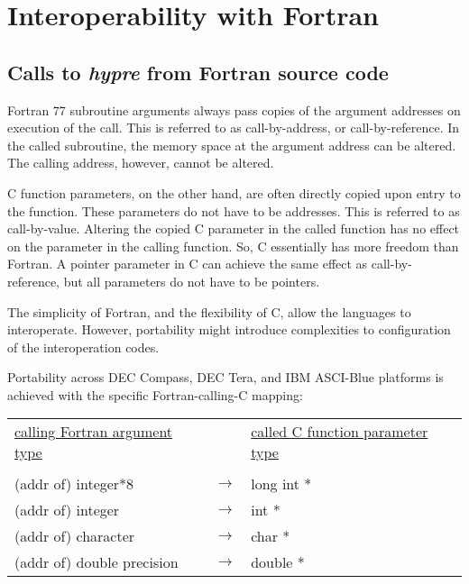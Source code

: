 \chapter{Interoperability with Fortran}

\section{Calls to {\itshape hypre} from Fortran source code}

Fortran 77 subroutine arguments always pass copies of the argument addresses
on execution of the call.  This is referred to as call-by-address, or
call-by-reference.  In the called subroutine, the memory space at the
argument address can be altered.  The calling address, however, cannot be
altered.

C function parameters, on the other hand, are often directly copied upon
entry to the function.  These parameters do not have to be addresses.
This is referred to as call-by-value.  Altering the copied C parameter in the
called function has no effect on the parameter in the calling function.  So,
C essentially has more freedom than Fortran.  A pointer parameter in C can
achieve the same effect as call-by-reference, but all parameters do not have
to be pointers.

The simplicity of Fortran, and the flexibility of C, allow the languages to
interoperate.  However, portability might introduce complexities to
configuration of the interoperation codes.

Portability across DEC Compass, DEC Tera, and IBM ASCI-Blue platforms is
achieved with the specific Fortran-calling-C mapping: 

\vspace{0.2in}

\begin{tabular}{lcl}

\underline{calling Fortran argument type} & &
\underline{called C function parameter type} \\
                              &                   &   \\
\hspace{0.1in} (addr of) integer*8        & $\longrightarrow$ &
\hspace{0.3in} long int * \\
\hspace{0.1in} (addr of) integer          & $\longrightarrow$ &
\hspace{0.3in} int * \\
\hspace{0.1in} (addr of) character        & $\longrightarrow$ &
\hspace{0.3in} char * \\
\hspace{0.1in} (addr of) double precision & $\longrightarrow$ &
\hspace{0.3in} double * \\

\end{tabular}

